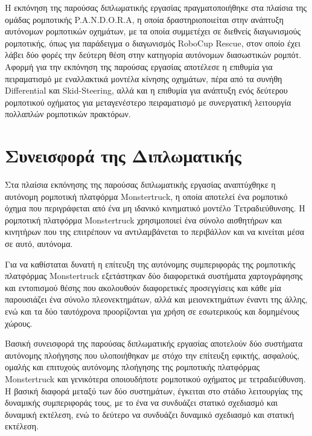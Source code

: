 \bigskip
Η εκπόνηση της παρούσας διπλωματικής εργασίας πραγματοποιήθηκε στα πλαίσια της ομάδας ρομποτικής P.A.N.D.O.R.A, η οποία δραστηριοποιείται στην ανάπτυξη αυτόνομων ρομποτικών οχημάτων, με τα οποία συμμετέχει σε διεθνείς διαγωνισμούς ρομποτικής, όπως για παράδειγμα ο διαγωνισμός RoboCup Rescue, στον οποίο έχει λάβει δύο φορές την δεύτερη θέση στην κατηγορία αυτόνομων διασωστικών ρομπότ. Αφορμή για την εκπόνηση της παρούσας εργασίας αποτέλεσε η επιθυμία για πειραματισμό με εναλλακτικά μοντέλα κίνησης οχημάτων, πέρα από τα συνήθη Differential και Skid-Steering, αλλά και η επιθυμία για ανάπτυξη ενός δεύτερου ρομποτικού οχήματος για μεταγενέστερο πειραματισμό με συνεργατική λειτουργία πολλαπλών ρομποτικών πρακτόρων.


\section{Συνεισφορά της Διπλωματικής}
Στα πλαίσια εκπόνησης της παρούσας διπλωματικής εργασίας αναπτύχθηκε η αυτόνομη ρομποτική πλατφόρμα Monstertruck, η οποία αποτελεί ένα ρομποτικό όχημα που περιγράφεται από ένα μη ιδανικό κινηματικό μοντέλο Τετραδιεύθυνσης. Η ρομποτική πλατφόρμα Monstertruck χρησιμοποιεί ένα σύνολο αισθητήρων και κινητήρων που της επιτρέπουν να αντιλαμβάνεται το περιβάλλον και να κινείται μέσα σε αυτό, αυτόνομα.

\bigskip
Για να καθίσταται δυνατή η επίτευξη της αυτόνομης συμπεριφοράς της ρομποτικής πλατφόρμας Monstertruck εξετάστηκαν δύο διαφορετικά συστήματα χαρτογράφησης και εντοπισμού θέσης που ακολουθούν διαφορετικές προσεγγίσεις και κάθε μία παρουσιάζει ένα σύνολο πλεονεκτημάτων, αλλά και μειονεκτημάτων έναντι της άλλης, ενώ και τα δύο ταυτόχρονα προορίζονται για χρήση σε εσωτερικούς και δομημένους χώρους.

\bigskip
Βασική συνεισφορά της παρούσας διπλωματικής εργασίας αποτελούν δύο συστήματα αυτόνομης πλοήγησης που υλοποιήθηκαν με στόχο την επίτευξη εφικτής, ασφαλούς, ομαλής και επιτυχούς αυτόνομης πλοήγησης της ρομποτικής πλατφόρμας Monstertruck και γενικότερα οποιουδήποτε ρομποτικού οχήματος με τετραδιεύθυνση. Η βασική διαφορά μεταξύ των δύο συστημάτων, έγκειται στο στάδιο λειτουργίας της δυναμικής συμπεριφοράς τους, με το ένα να συνδυάζει στατικό σχεδιασμό και δυναμική εκτέλεση, ενώ το δεύτερο να συνδυάζει δυναμικό σχεδιασμό και στατική εκτέλεση.


